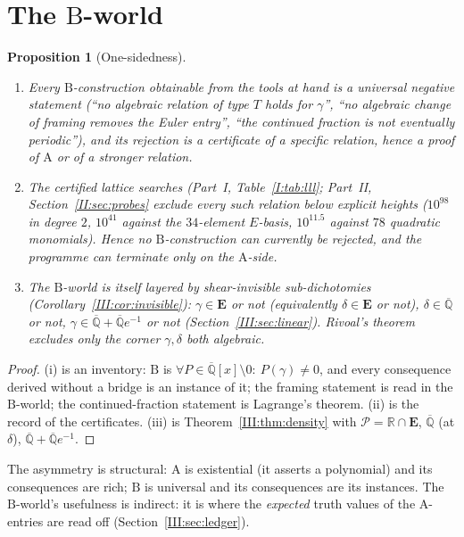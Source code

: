 \documentclass[11pt,a4paper]{article}
\newcommand{\R}{\mathbb R}
\newcommand{\Qbar}{\overline{\mathbb Q}}
\newcommand{\EE}{\mathbf E}
\newcommand{\Pc}{\mathcal P}
\newtheorem{proposition}[theorem]{Proposition}
\theoremstyle{definition}
\theoremstyle{remark}
\numberwithin{equation}{section}
\begin{document}
\section{The $\mathrm B$-world}\label{III:sec:Bworld}

\begin{proposition}[One-sidedness]\label{III:prop:onesided}
\begin{enumerate}[label=(\roman*)]
\item Every $\mathrm B$-construction obtainable from the tools at hand is a universal
negative statement (``no algebraic relation of type $T$ holds for $\gamma$'', ``no
algebraic change of framing removes the Euler entry'', ``the continued fraction is not
eventually periodic''), and its rejection is a certificate of a specific relation, hence
a proof of $\mathrm A$ or of a stronger relation.
\item The certified lattice searches (Part~I, Table~\ref{I:tab:lll}; Part~II, Section~\ref{II:sec:probes} exclude every
such relation below explicit heights ($10^{98}$ in degree $2$, $10^{41}$ against the
$34$-element $E$-basis, $10^{11.5}$ against $78$ quadratic monomials). Hence no
$\mathrm B$-construction can currently be rejected, and the programme can terminate only
on the $\mathrm A$-side.
\item The $\mathrm B$-world is itself layered by shear-invisible sub-dichotomies
(Corollary~\ref{III:cor:invisible}): $\gamma\in\EE$ or not (equivalently $\delta\in\EE$ or
not), $\delta\in\Qbar$ or not, $\gamma\in\Qbar+\Qbar e^{-1}$ or not
(Section~\ref{III:sec:linear}). Rivoal's theorem \cite[Thm.~2]{Rivoal2012} excludes only the
corner $\gamma,\delta$ both algebraic.
\end{enumerate}
\end{proposition}
\begin{proof}
(i) is an inventory: $\mathrm B$ is $\forall P\in\Qbar[x]\setminus0:\ P(\gamma)\ne0$, and
every consequence derived without a bridge is an instance of it; the framing statement
is \cite[Thm.~``Euler Stokes-framing barrier'']{K002} read in the $\mathrm B$-world; the
continued-fraction statement is Lagrange's theorem. (ii) is the record of the
certificates. (iii) is Theorem~\ref{III:thm:density} with $\Pc=\R\cap\EE$, $\Qbar$ (at
$\delta$), $\Qbar+\Qbar e^{-1}$.
\end{proof}

The asymmetry is structural: $\mathrm A$ is existential (it asserts a polynomial) and its
consequences are rich; $\mathrm B$ is universal and its consequences are its instances.
The $\mathrm B$-world's usefulness is indirect: it is where the \emph{expected} truth
values of the $\mathrm A$-entries are read off (Section~\ref{III:sec:ledger}).
\end{document}
